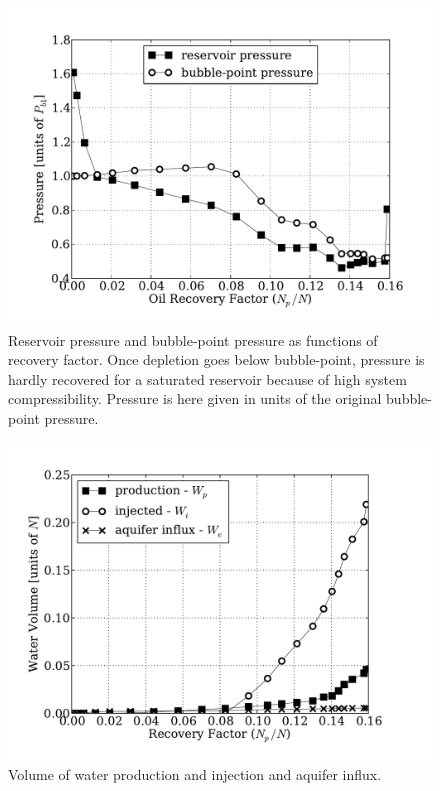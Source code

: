 \documentclass[final,authoryear,5p,times,twocolumn,10pt]{elsarticle}
\begin{document}
\pagebreak

\begin{figure}
\centering
\includegraphics[width=\linewidth]{./python/matbal_p}
\caption{Reservoir pressure and bubble-point pressure as functions of recovery factor. Once depletion goes below bubble-point, pressure is hardly recovered for a saturated reservoir because of high system compressibility. Pressure is here given in units of the original bubble-point pressure.}
\label{fig: matbal_p}
\end{figure}

\begin{figure}
\centering
\includegraphics[width=\linewidth]{./python/matbal_water}
\caption{Volume of water production and injection and aquifer influx.}
\label{fig: matbal_water}
\end{figure}
\end{document}

